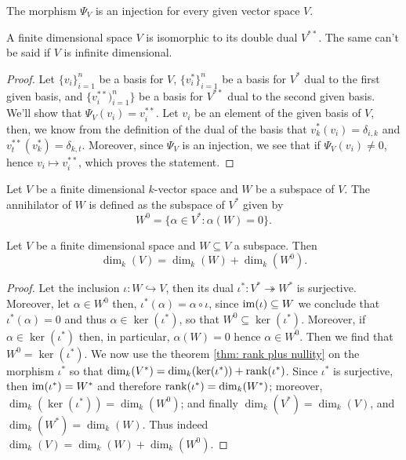 \begin{proposition}
  The morphism \(\Psi_V\) is an injection for every given vector space \(V\).
\end{proposition}

\begin{proposition}
  A finite dimensional space \(V\) is isomorphic to its double dual
  \(V^{\ast\ast}\). The same can't be said if \(V\) is infinite dimensional.
\end{proposition}

\begin{proof}
  Let \(\{v_i\}_{i=1}^n\) be a basis for \(V\), \(\{v_i^\ast\}_{i=1}^n\) be a
  basis for \(V^\ast\) dual to the first given basis, and
  \(\{v_i^{\ast\ast})_{i=1}^n\}\) be a basis for \(V^{\ast\ast}\) dual to the
  second given basis. We'll show that \(\Psi_V(v_i) = v_i^{\ast\ast}\). Let
  \(v_i\) be an element of the given basis of \(V\), then, we know from the
  definition of the dual of the basis that \(v_k^\ast(v_i) = \delta_{i, k}\) and
  \(v_t^{\ast\ast}(v_k^\ast) = \delta_{k, t}\).  Moreover, since \(\Psi_V\) is
  an injection, we see that if \(\Psi_V(v_i) \neq 0\), hence \(v_i \mapsto
  v_i^{\ast\ast}\), which proves the statement.
\end{proof}

\begin{definition}[Annihilator]\label{def: annihilator}
  Let \(V\) be a finite dimensional \(k\)-vector space and \(W\) be a subspace
  of \(V\). The annihilator of \(W\) is defined as the subspace of \(V^\ast\) 
  given by
  \[
    W^0 = \{\alpha \in V^\ast : \alpha(W) = 0\}.
  \] 
\end{definition}

\begin{proposition}
  Let \(V\) be a finite dimensional space and \(W \subseteq V\) a subspace. Then
  \[
    \dim_k(V) = \dim_k(W) + \dim_k(W^0).
  \] 
\end{proposition}

\begin{proof}
  Let the inclusion \(\iota : W \hookrightarrow V\), then its dual \(\iota^\ast :
  V^\ast \twoheadrightarrow W^\ast\) is surjective. Moreover, let \(\alpha \in
  W^0\) then, \(\iota^\ast(\alpha) = \alpha \circ \iota\), since \(\operatorname{im}(\iota)
  \subseteq W\) we conclude that \(\iota^\ast(\alpha) = 0\) and thus \(\alpha
  \in \ker(\iota^\ast)\), so that \(W^0 \subseteq \ker(\iota^\ast)\). Moreover,
  if \(\alpha \in \ker(\iota^\ast)\) then, in particular, \(\alpha(W) = 0\)
  hence \(\alpha \in W^0\). Then we find that \(W^0 = \ker(\iota^\ast)\). We now
  use the theorem \ref{thm: rank plus nullity} on the morphism \(\iota^\ast\) so
  that \(\dim_k(V^\ast) = \dim_k(\ker(\iota^\ast)) + \operatorname{rank}(\iota^\ast)\). Since
  \(\iota^\ast\) is surjective, then \(\operatorname{im}(\iota^\ast) = W^\ast\) and therefore
  \(\operatorname{rank}(\iota^\ast) = \dim_k(W^\ast)\); moreover, \(\dim_k(\ker(\iota^\ast)) =
  \dim_k(W^0)\); and finally \(\dim_k(V^\ast) = \dim_k(V)\), and
  \(\dim_k(W^\ast) = \dim_k(W)\). Thus indeed \(\dim_k(V) = \dim_k(W) +
  \dim_k(W^0)\).
\end{proof}
